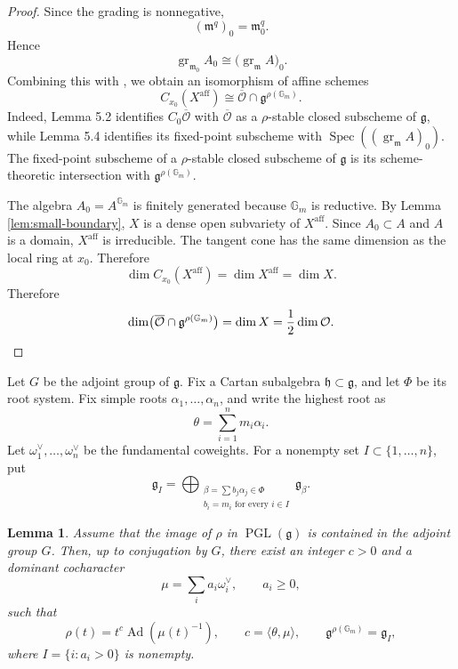 \documentclass[10pt,a4paper]{amsart}
\newtheorem{lemma}[theorem]{Lemma}
\DeclareMathOperator{\Spec}{Spec}
\DeclareMathOperator{\Ad}{Ad}
\newcommand{\Gm}{\mathbb G_m}
\newcommand{\aff}{\mathrm{aff}}
\begin{document}
\begin{proof}
Since the grading is nonnegative,
\[
(\mathfrak m^q)_0=\mathfrak m_0^q.
\]
Hence
\[
\operatorname{gr}_{\mathfrak m_0}A_0
\cong
\bigl(\operatorname{gr}_{\mathfrak m}A\bigr)_0.
\]
Combining this with \cite[Lemmas 5.2 and 5.4]{Jia}, we obtain an
isomorphism of affine schemes
\[
C_{x_0}(X^{\aff})
\cong
\overline{\mathcal O}\cap
\mathfrak g^{\rho(\Gm)}.
\]
Indeed, Lemma 5.2 identifies $C_0\overline{\mathcal O}$ with
$\overline{\mathcal O}$ as a $\rho$-stable closed subscheme of
$\mathfrak g$, while Lemma 5.4 identifies its fixed-point subscheme
with $\Spec((\operatorname{gr}_{\mathfrak m}A)_0)$.
The fixed-point subscheme of a $\rho$-stable closed subscheme of
$\mathfrak g$ is its scheme-theoretic intersection with
$\mathfrak g^{\rho(\Gm)}$.

The algebra $A_0=A^{\Gm}$ is finitely generated because $\Gm$ is
reductive. By Lemma \ref{lem:small-boundary}, $X$ is a dense open
subvariety of $X^{\aff}$. Since $A_0\subset A$ and $A$ is a domain,
$X^{\aff}$ is irreducible. The tangent cone has the same dimension as
the local ring at $x_0$. Therefore
\[
\dim C_{x_0}(X^{\aff})
=\dim X^{\aff}
=\dim X.
\]
Therefore
\[
\dim\bigl(\overline{\mathcal O}\cap\mathfrak g^{\rho(\Gm)}\bigr)
=\dim X
=\frac12\dim\mathcal O.
\qedhere
\]
\end{proof}

Let $G$ be the adjoint group of $\mathfrak g$. Fix a Cartan subalgebra
$\mathfrak h\subset\mathfrak g$, and let $\Phi$ be its root system.
Fix simple roots $\alpha_1,\ldots,\alpha_n$, and write the highest root as
\[
\theta=\sum_{i=1}^n m_i\alpha_i.
\]
Let $\omega_1^\vee,\ldots,\omega_n^\vee$ be the fundamental
coweights. For a nonempty set $I\subset\{1,\ldots,n\}$, put
\[
\mathfrak g_I=
\bigoplus_{\substack{\beta=\sum b_j\alpha_j\in\Phi\\
b_i=m_i\text{ for every }i\in I}}
\mathfrak g_\beta.
\]

\begin{lemma}\label{lem:top-root}
Assume that the image of $\rho$ in
$\operatorname{PGL}(\mathfrak g)$ is contained in the adjoint group
$G$.
Then, up to conjugation by $G$, there exist an integer $c>0$ and a
dominant cocharacter
\[
\mu=\sum_i a_i\omega_i^\vee,
\qquad a_i\geq0,
\]
such that
\[
\rho(t)=t^c\Ad(\mu(t)^{-1}),
\qquad
c=\langle\theta,\mu\rangle,
\qquad
\mathfrak g^{\rho(\Gm)}=\mathfrak g_I,
\]
where $I=\{i:a_i>0\}$ is nonempty.
\end{lemma}
\end{document}

